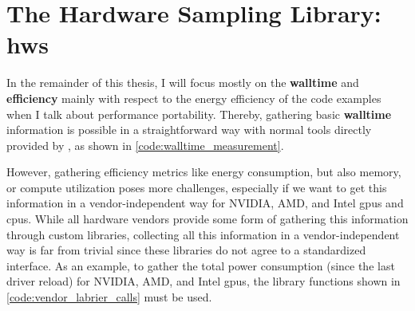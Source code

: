 



\section{The Hardware Sampling Library: hws}

In the remainder of this thesis, I will focus mostly on the \textbf{walltime} and \textbf{efficiency} mainly with respect to the energy efficiency of the code examples when I talk about performance portability. 
Thereby, gathering basic \textbf{walltime} information is possible in a straightforward way with normal tools directly provided by \cpp, as shown in \autoref{code:walltime_measurement}.


However, gathering efficiency metrics like energy consumption, but also memory, or compute utilization poses more challenges, especially if we want to get this information in a vendor-independent way for NVIDIA, AMD, and Intel \glspl{gpu} and \glspl{cpu}. 
While all hardware vendors provide some form of gathering this information through custom libraries, collecting all this information in a vendor-independent way is far from trivial since these libraries do not agree to a standardized interface. 
As an example, to gather the total power consumption (since the last driver reload) for NVIDIA, AMD, and Intel \glspl{gpu}, the library functions shown in \autoref{code:vendor_labrier_calls} must be used.

